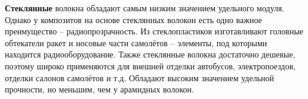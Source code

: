 \textbf{Стеклянные} волокна обладают самым низким значением удельного модуля. Однако у композитов на основе стеклянных волокон есть одно важное преимущество – радиопрозрачность. Из стеклопластиков изготавливают головные обтекатели ракет и носовые части самолётов – элементы, под которыми находится радиооборудование. Также стеклянные волокна достаточно дешевые, поэтому широко применяются для внешней отделки автобусов, электропоездов, отделки салонов самолётов и т.д. Обладают высоким значением удельной прочности, но меньшим, чем у арамидных волокон.


